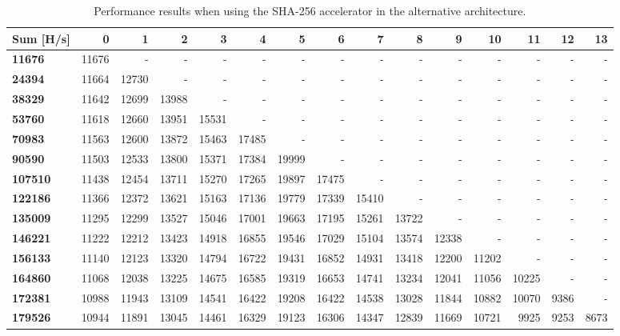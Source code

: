 \begin{appendix}
\begin{sidewaystable}
\centering
\begin{tabular}{| l || r r r r r r r r r r r r r r |}
  \hline 
  \textbf{Sum} [H/s] & \textbf{0} & \textbf{1} & \textbf{2} & \textbf{3} & \textbf{4} & \textbf{5} & \textbf{6} & \textbf{7} & \textbf{8} & \textbf{9} & \textbf{10} & \textbf{11} & \textbf{12} & \textbf{13}\\
  \hline                       
  \textbf{11676} & 11676 & - & - & - & - & - & - & - & - & - & - & - & - & -\\
  \textbf{24394} & 11664 & 12730 & - & - & - & - & - & - & - & - & - & - & - & -\\
  \textbf{38329} & 11642 & 12699 & 13988 & - & - & - & - & - & - & - & - & - & - & -\\
  \textbf{53760} & 11618 & 12660 & 13951 & 15531 & - & - & - & - & - & - & - & - & - & -\\
  \textbf{70983} & 11563 & 12600 & 13872 & 15463 & 17485 & - & - & - & - & - & - & - & - & -\\
  \textbf{90590} & 11503 & 12533 & 13800 & 15371 & 17384 & 19999 & - & - & - & - & - & - & - & -\\
  \textbf{107510} & 11438 & 12454 & 13711 & 15270 & 17265 & 19897 & 17475 & - & - & - & - & - & - & -\\
  \textbf{122186} & 11366 & 12372 & 13621 & 15163 & 17136 & 19779 & 17339 & 15410 & - & - & - & - & - & -\\
  \textbf{135009} & 11295 & 12299 & 13527 & 15046 & 17001 & 19663 & 17195 & 15261 & 13722 & - & - & - & - & -\\
  \textbf{146221} & 11222 & 12212 & 13423 & 14918 & 16855 & 19546 & 17029 & 15104 & 13574 & 12338 & - & - & - & -\\
  \textbf{156133} & 11140 & 12123 & 13320 & 14794 & 16722 & 19431 & 16852 & 14931 & 13418 & 12200 & 11202 & - & - & -\\
  \textbf{164860} & 11068 & 12038 & 13225 & 14675 & 16585 & 19319 & 16653 & 14741 & 13234 & 12041 & 11056 & 10225 & - & -\\
  \textbf{172381} & 10988 & 11943 & 13109 & 14541 & 16422 & 19208 & 16422 & 14538 & 13028 & 11844 & 10882 & 10070 & 9386 & -\\
  \textbf{179526} & 10944 & 11891 & 13045 & 14461 & 16329 & 19123 & 16306 & 14347 & 12839 & 11669 & 10721 & 9925 & 9253 & 8673 \\
  \hline  
\end{tabular}
\caption{Performance results when using the SHA-256 accelerator in the alternative architecture.}
\label{tab:Perf-SHA2}
\end{sidewaystable}


\end{appendix}
